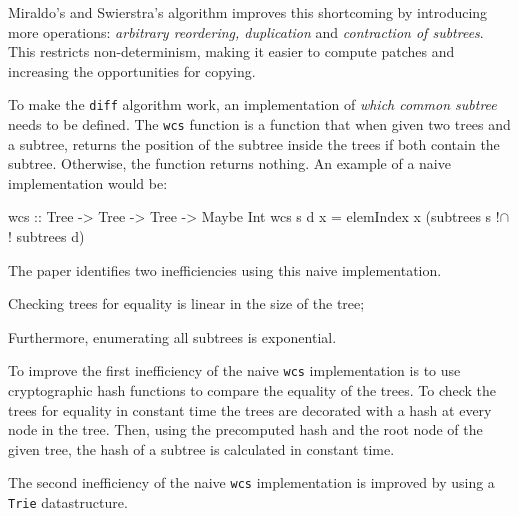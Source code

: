 Miraldo's and Swierstra's algorithm improves this shortcoming by introducing more operations: \textit{arbitrary reordering, duplication} and \textit{contraction of subtrees}. This restricts non-determinism, making it easier to compute patches and increasing the opportunities for copying.

\newpage
To make the \texttt{diff} algorithm work, an implementation of \textit{which common subtree} needs to be defined. The \texttt{wcs} function is a function that when given two trees and a subtree, returns the position of the subtree inside the trees if both contain the subtree. Otherwise, the function returns nothing. An example of a naive implementation would be:

\begin{haskell}
    wcs :: Tree -> Tree -> Tree -> Maybe Int
    wcs s d x = elemIndex x (subtrees s !$\cap$! subtrees d) 
\end{haskell}

The paper identifies two inefficiencies using this naive implementation.
\begin{enumerate*}[label=(\Alph*)]
    \item Checking trees for equality is linear in the size of the tree;
    \item Furthermore, enumerating all subtrees is exponential.
\end{enumerate*}

To improve the first inefficiency of the naive \texttt{wcs} implementation is to use cryptographic hash functions to compare the equality of the trees. To check the trees for equality in constant time the trees are decorated with a hash at every node in the tree. Then, using the precomputed hash and the root node of the given tree, the hash of a subtree is calculated in constant time.

The second inefficiency of the naive \texttt{wcs} implementation is improved by using a \texttt{Trie}\cite{brass2008trie} datastructure. 

